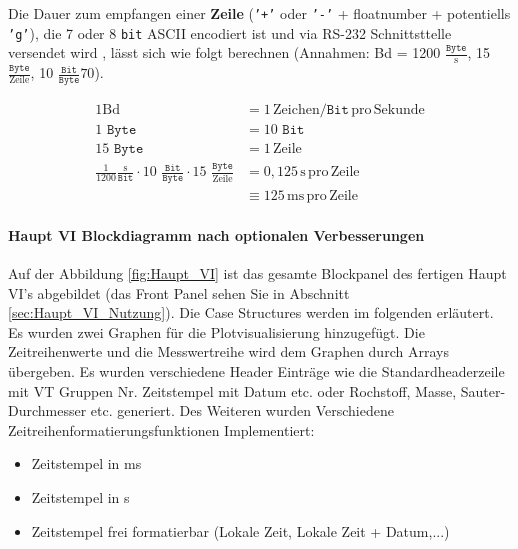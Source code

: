 Die Dauer zum empfangen einer \textbf{Zeile} (\texttt{'+'} oder \texttt{'-'} + floatnumber + potentiells \texttt{'g'}), die 7 oder 8 \texttt{bit} ASCII encodiert ist und via RS-232 Schnittsttelle versendet wird , lässt sich wie folgt berechnen (Annahmen: Bd = 1200 $\frac{\texttt{Byte}}{\mathrm{s}}$, 15 $\frac{\texttt{Byte}}{\mathrm{Zeile}}$, 10 $\frac{\texttt{Bit}}{\texttt{Byte}}70
$). 


\begin{align} 
1	\mathrm{Bd} 	&=	1	\,	\mathrm{Zeichen/		\texttt{Bit} \,	pro \, Sekunde} \\
1	\, \,	\texttt{Byte}	&=	10	\, \,	\texttt{Bit} \\
15 \, \,	 \texttt{Byte} &= 1 \, \mathrm{Zeile} \\
 \frac{1}{1200}  \frac{\mathrm{s}}{\texttt{Bit}} \cdot
  10 \,\, \frac{\texttt{Bit}}{\texttt{Byte}} \cdot
   15 \,\,  \frac{\texttt{Byte}}{\mathrm{Zeile}} 	&=
    0,125 \, \mathrm{s \, pro \, Zeile} \\
    											&\equiv 125 \, \mathrm{ms \, pro \, Zeile}
\end{align}


\paragraph{Haupt VI Blockdiagramm nach optionalen Verbesserungen} Auf der Abbildung \ref{fig:Haupt_VI} ist das gesamte Blockpanel des fertigen Haupt VI's abgebildet (das Front Panel sehen Sie in Abschnitt \ref{sec:Haupt_VI_Nutzung}). Die Case Structures werden im folgenden erläutert.\\

Es wurden zwei Graphen für die Plotvisualisierung hinzugefügt. Die Zeitreihenwerte und die Messwertreihe wird dem Graphen durch Arrays übergeben. Es wurden verschiedene Header Einträge wie die \glqq Standardheaderzeile\grqq{} mit VT Gruppen Nr. Zeitstempel mit Datum etc. oder Rochstoff, Masse, Sauter-Durchmesser etc. generiert. Des Weiteren wurden Verschiedene Zeitreihenformatierungsfunktionen Implementiert:

\begin{itemize} %
\singlespacing
\item Zeitstempel in ms
\item Zeitstempel in s
\item Zeitstempel frei formatierbar (Lokale Zeit, Lokale Zeit + Datum,...)
\end{itemize}

